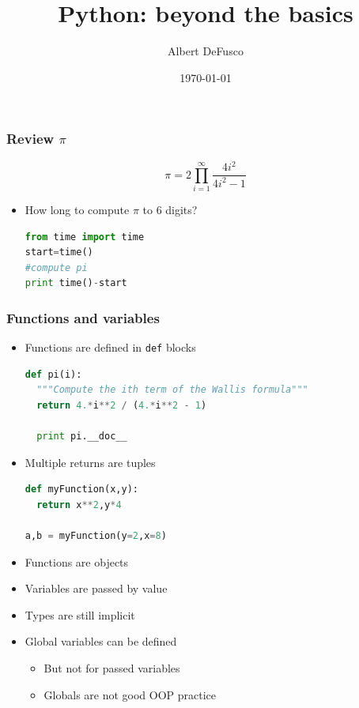 \documentclass[xcolor=table,10pt,final]{beamer}
\begin{document}
\title{Python: beyond the basics}
\author{Albert DeFusco}
\date{\today}


\frame{\titlepage}

\begin{frame}[fragile]
  \frametitle{Review $\pi$}
  \begin{equation*}
    \pi = 2\prod^{\infty}_{i=1}\frac{4i^2}{4i^2-1}
  \end{equation*}
  \begin{itemize}
    \item<2-> How long to compute $\pi$ to 6 digits?\\
      \begin{lstlisting}[language=python]
from time import time
start=time()
#compute pi
print time()-start
      \end{lstlisting}
  \end{itemize}
\end{frame}

\begin{frame}[fragile]
  \frametitle{Functions and variables}
  \begin{itemize}
    \item Functions are defined in {\tt def} blocks\\
      \begin{lstlisting}[language=python]
def pi(i):
  """Compute the ith term of the Wallis formula"""
  return 4.*i**2 / (4.*i**2 - 1)

  print pi.__doc__
      \end{lstlisting}
    \item Multiple returns are tuples\\
      \begin{lstlisting}[language=python]
def myFunction(x,y):
  return x**2,y*4

a,b = myFunction(y=2,x=8)
      \end{lstlisting}
    \item Functions are objects
    \item Variables are passed by value
    \item Types are still implicit
    \item Global variables can be defined
      \begin{itemize}
        \item But not for passed variables
        \item Globals are not good OOP practice
      \end{itemize}
  \end{itemize}
\end{frame}
\end{document}
